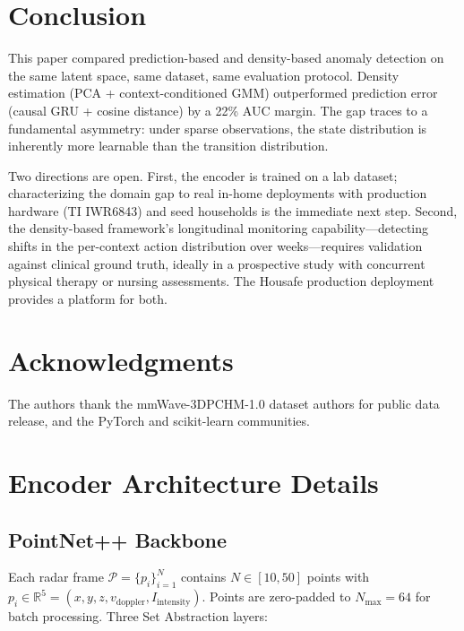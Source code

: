 \documentclass[11pt,a4paper]{article}
\begin{document}
\section{Conclusion}

This paper compared prediction-based and density-based anomaly detection on the same latent space, same dataset, same evaluation protocol.
Density estimation (PCA + context-conditioned GMM) outperformed prediction error (causal GRU + cosine distance) by a 22\% AUC margin.
The gap traces to a fundamental asymmetry: under sparse observations, the state distribution is inherently more learnable than the transition distribution.

Two directions are open.
First, the encoder is trained on a lab dataset; characterizing the domain gap to real in-home deployments with production hardware (TI IWR6843) and seed households is the immediate next step.
Second, the density-based framework's longitudinal monitoring capability---detecting shifts in the per-context action distribution over weeks---requires validation against clinical ground truth, ideally in a prospective study with concurrent physical therapy or nursing assessments.
The Housafe production deployment provides a platform for both.

\section*{Acknowledgments}
The authors thank the mmWave-3DPCHM-1.0 dataset authors for public data release, and the PyTorch and scikit-learn communities.

\appendix
\section{Encoder Architecture Details}

\subsection{PointNet++ Backbone}

Each radar frame $\mathcal{P} = \{p_i\}_{i=1}^{N}$ contains $N \in [10, 50]$ points with $p_i \in \mathbb{R}^5 = (x, y, z, v_{\text{doppler}}, I_{\text{intensity}})$.
Points are zero-padded to $N_{\max}{=}64$ for batch processing.
Three Set Abstraction layers:
\end{document}
